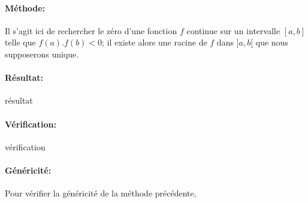 \documentclass[11pt,a4paper,colorlinks,breaklinks]{article}
\begin{document}
\begin{framed}

\end{framed}

\paragraph{Méthode:} Il s'agit ici de 
rechercher le zéro d'une fonction $f$ continue sur un 
intervalle $[a,b]$ telle que $f(a).f(b) < 0$;
il existe alors une racine de $f$ dans $]a,b[$ que nous supposerons 
unique. 


\paragraph{Résultat:} résultat

\paragraph{Vérification:} vérification

\paragraph{Généricité:} Pour vérifier la généricité de la méthode précédente,
\end{document}
